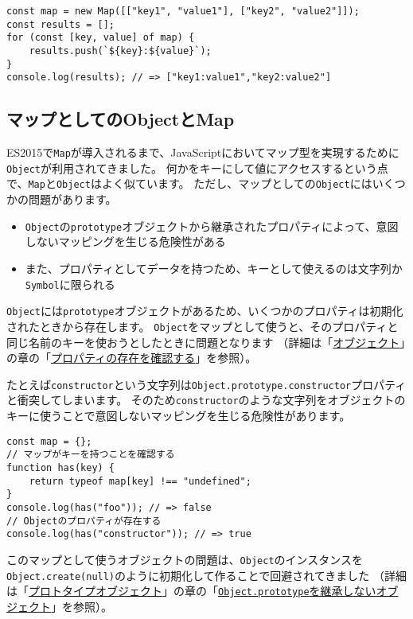 \begin{lstlisting}
const map = new Map([["key1", "value1"], ["key2", "value2"]]);
const results = [];
for (const [key, value] of map) {
    results.push(`${key}:${value}`);
}
console.log(results); // => ["key1:value1","key2:value2"]
\end{lstlisting}

\hypertarget{object-and-map}{%
\subsection{マップとしてのObjectとMap}\label{object-and-map}}

ES2015で\texttt{Map}が導入されるまで、JavaScriptにおいてマップ型を実現するために\texttt{Object}が利用されてきました。
何かをキーにして値にアクセスするという点で、\texttt{Map}と\texttt{Object}はよく似ています。
ただし、マップとしての\texttt{Object}にはいくつかの問題があります。

\begin{itemize}
\item
  \texttt{Object}の\texttt{prototype}オブジェクトから継承されたプロパティによって、意図しないマッピングを生じる危険性がある
\item
  また、プロパティとしてデータを持つため、キーとして使えるのは文字列か\texttt{Symbol}に限られる
\end{itemize}

\texttt{Object}には\texttt{prototype}オブジェクトがあるため、いくつかのプロパティは初期化されたときから存在します。
\texttt{Object}をマップとして使うと、そのプロパティと同じ名前のキーを使おうとしたときに問題となります
（詳細は「\hyperlink{object}{オブジェクト}」の章の「\hyperlink{confirm-property}{プロパティの存在を確認する}」を参照）。

たとえば\texttt{constructor}という文字列は\texttt{Object.prototype.constructor}プロパティと衝突してしまいます。
そのため\texttt{constructor}のような文字列をオブジェクトのキーに使うことで意図しないマッピングを生じる危険性があります。

\begin{lstlisting}
const map = {};
// マップがキーを持つことを確認する
function has(key) {
    return typeof map[key] !== "undefined";
}
console.log(has("foo")); // => false
// Objectのプロパティが存在する
console.log(has("constructor")); // => true
\end{lstlisting}

このマップとして使うオブジェクトの問題は、\texttt{Object}のインスタンスを\texttt{Object.create(null)}のように初期化して作ることで回避されてきました
（詳細は「\hyperlink{prototype-object}{プロトタイプオブジェクト}」の章の「\hyperlink{not-inherit-object}{\texttt{Object.prototype}を継承しないオブジェクト}」を参照）。

